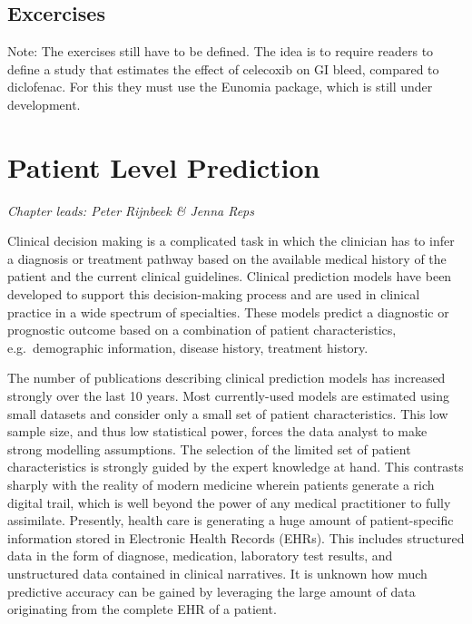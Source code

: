 \documentclass[11pt]{book}
\theoremstyle{definition}
\theoremstyle{definition}
\theoremstyle{definition}
\theoremstyle{remark}
\begin{document}
\hypertarget{excercises}{%
\section{Excercises}\label{excercises}}

Note: The exercises still have to be defined. The idea is to require readers to define a study that estimates the effect of celecoxib on GI bleed, compared to diclofenac. For this they must use the Eunomia package, which is still under development.

\hypertarget{PatientLevelPrediction}{%
\chapter{Patient Level Prediction}\label{PatientLevelPrediction}}

\emph{Chapter leads: Peter Rijnbeek \& Jenna Reps}


Clinical decision making is a complicated task in which the clinician has to infer a diagnosis or treatment pathway based on the available medical history of the patient and the current clinical guidelines. Clinical prediction models have been developed to support this decision-making process and are used in clinical practice in a wide spectrum of specialties. These models predict a diagnostic or prognostic outcome based on a combination of patient characteristics, e.g.~demographic information, disease history, treatment history.   

The number of publications describing clinical prediction models has increased strongly over the last 10 years. Most currently-used models are estimated using small datasets and consider only a small set of patient characteristics. This low sample size, and thus low statistical power, forces the data analyst to make strong modelling assumptions. The selection of the limited set of patient characteristics is strongly guided by the expert knowledge at hand. This contrasts sharply with the reality of modern medicine wherein patients generate a rich digital trail, which is well beyond the power of any medical practitioner to fully assimilate. Presently, health care is generating a huge amount of patient-specific information stored in Electronic Health Records (EHRs). This includes structured data in the form of diagnose, medication, laboratory test results, and unstructured data contained in clinical narratives. It is unknown how much predictive accuracy can be gained by leveraging the large amount of data originating from the complete EHR of a patient. 
\end{document}
